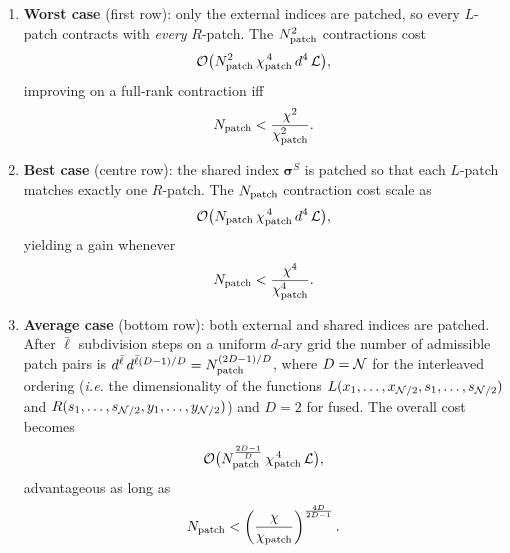 \begingroup
\renewcommand{\labelenumi}{(\alph{enumi})}
\begin{enumerate}
\item \textbf{Worst case} (first row):  
      only the external indices are patched, so every \(L\)-patch contracts
      with \emph{every} \(R\)-patch.  
      The \(N_{\text{patch}}^{2}\) contractions cost
      \begin{equation}
        \label{eq:worsScaling}
        \mathcal{O}\bigl(
           N_{\text{patch}}^{2}\,
           \chi_{\text{patch}}^{\,4}\,d^{4}\,\mathcal L
        \bigr),
      \end{equation}
      improving on a full-rank contraction iff
      \begin{equation}
       N_{\text{patch}}<\frac{\chi^{2}}{\chi_{\text{patch}}^{2}}.
       \label{eq:worstBound}
      \end{equation}
      

\item \textbf{Best case} (centre row):  
      the shared index \(\boldsymbol{\sigma}^{S}\) is patched so that each
      \(L\)-patch matches exactly one \(R\)-patch.  
      The \(N_{\text{patch}} \) contraction cost scale as
      \begin{equation}
        \mathcal{O}\bigl(
          N_{\text{patch}} \,
          \chi_{\text{patch}}^{\,4}\,d^{4}\,\mathcal L
        \bigr),
      \end{equation}
      yielding a gain whenever
      \begin{equation}
       N_{\text{patch}}<\frac{\chi^{4}}{\chi_{\text{patch}}^{4}}.
       \label{eq:bestBound}
      \end{equation}

\item \textbf{Average case} (bottom row):  
      both external and shared indices are patched.  
      After \(\bar\ell\) subdivision steps on a uniform \(d\)-ary grid the
      number of admissible patch pairs is
      \(d^{\bar\ell}\,d^{\bar\ell( D-1)/D}
       =N_{\text{patch}}^{(2D-1)/D}\), where $D=\mathcal{N}$ for the interleaved ordering (\textit{i.e.} the dimensionality of the functions $L(x_1,\dots,x_{\mathcal{N}/2},s_1,\dots,s_{\mathcal{N}/2})$ and $R(s_1,\dots,s_{\mathcal{N}/2},y_1,\dots,y_{\mathcal{N}/2})$) and \(D=2\) for fused.
      The overall cost becomes
      \begin{equation}
        \mathcal{O}\bigl(
          N_{\text{patch}}^{\frac{2D-1}{D}}\,
          \chi_{\text{patch}}^{\,4}\,\mathcal L
        \bigr),
      \end{equation}
      advantageous as long as
      \begin{equation}
        N_{\text{patch}}<\left(\frac{\chi}{\chi_{\text{patch}}}\right)^{\frac{4D}{2D-1}}.
        \label{eq:averageBound}
      \end{equation}
\end{enumerate}
\endgroup

